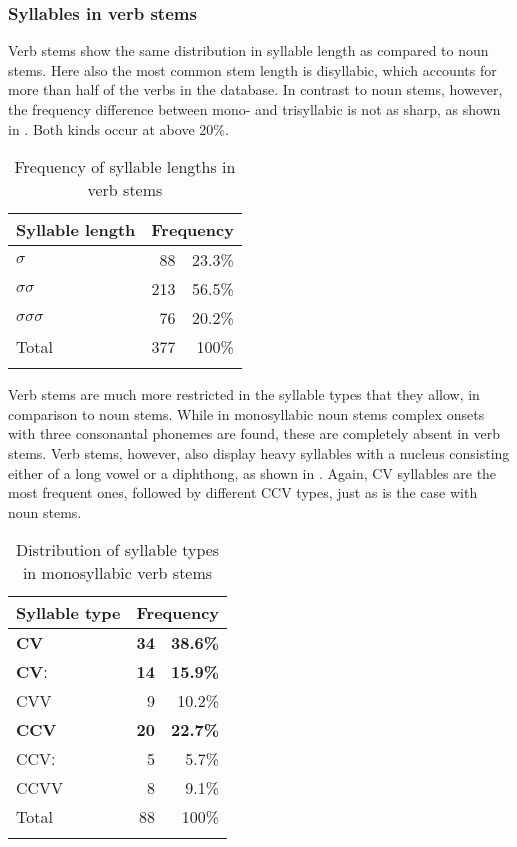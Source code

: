 \subsubsection{Syllables in verb stems}
\label{sec:SyllV}

Verb stems show the same distribution in syllable length as compared to noun stems. Here also the most common stem length is disyllabic, which accounts for more than half of the verbs in the database. In contrast to noun stems, however, the frequency difference between mono- and trisyllabic is not as sharp, as shown in .  Both kinds occur at above 20\%.

\begin{table}
\begin{tabular}{lrr}
\lsptoprule
Syllable length &  \multicolumn{2}{l}{Frequency} \\  \midrule
$\sigma$   & 88 & 23.3\% \\
$\sigma$$\sigma$ & 213 & 56.5\% \\
$\sigma$$\sigma$$\sigma$ & 76 & 20.2\% \\
 \midrule
Total & 377 & 100\% \\
\lspbottomrule
\end{tabular}
\caption{Frequency of syllable lengths in verb stems}
\label{Tab:VstemSyll}
\end{table}  
 
Verb stems are much more restricted in the syllable types that they allow, in comparison to noun stems. While in monosyllabic noun stems complex onsets with three consonantal phonemes are found, these are completely absent in verb stems. Verb stems, however, also display heavy syllables with a nucleus consisting either of a long vowel or a diphthong, as shown in . Again, CV syllables are the most frequent ones, followed by different CCV types, just as is the case with noun stems.

\begin{table}[t]
\begin{tabular}{lrr}
\lsptoprule
Syllable type & \multicolumn{2}{l}{Frequency} \\  \midrule
{\bfseries CV}	& 	{\bfseries 34}	& {\bfseries  38.6\%}  \\
{\bfseries CVː}	& 	{\bfseries 14}   & {\bfseries 15.9\%} \\
CVV	 & 	9     & 10.2\%  \\
\midrule
{\bfseries CCV} 	 &	{\bfseries 20} &  {\bfseries 22.7\%}   \\
CCVː   & 	5   & 5.7\%     \\
CCVV  & 	8   & 9.1\%    \\
 \midrule
Total 			&  88	 & 100\% \\
\lspbottomrule
\end{tabular}
\caption{Distribution of syllable types in monosyllabic verb stems}
\label{Tab:o1SyllV}
\end{table} 

